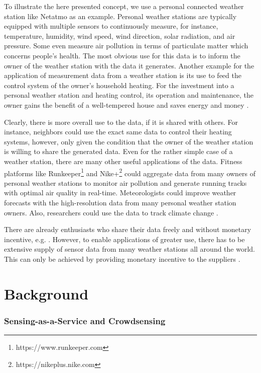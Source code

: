 To illustrate the here presented concept, we use a personal connected weather station like Netatmo \parencite{netatmo} as an example. Personal weather stations are typically equipped with multiple sensors to continuously measure, for instance, temperature, humidity, wind speed, wind direction, solar radiation, and air pressure. Some even measure air pollution in terms of particulate matter which concerns people's health. The most obvious use for this data is to inform the owner of the weather station with the data it generates. Another example for the application of measurement data from a weather station is its use to feed the control system of the owner's household heating. For the investment into a personal weather station and heating control, its operation and maintenance, the owner gains the benefit of a well-tempered house and saves energy and money \parencite{dong2014real}. 

Clearly, there is more overall use to the data, if it is shared with others. For instance, neighbors could use the exact same data to control their heating systems, however, only given the condition that the owner of the weather station is willing to share the generated data. Even for the rather simple case of a weather station, there are many other useful applications of the data. Fitness platforms like Runkeeper\footnote{https://www.runkeeper.com} and Nike+\footnote{https://nikeplus.nike.com} could aggregate data from many owners of personal weather stations to monitor air pollution and generate running tracks with optimal air quality in real-time. Meteorologists could improve weather forecasts with the high-resolution data from many personal weather station owners. Also, researchers could use the data to track climate change \parencite{JOC:JOC1276}.

There are already enthusiasts who share their data freely and without monetary incentive, e.g. \parencite{wunderground.com}. However, to enable applications of greater use, there has to be extensive supply of sensor data from many weather stations all around the world. This can only be achieved by providing monetary incentive to the suppliers \parencite{bohli2009initial}.

\section{Background}
\label{sec:s2aas_background}
\subsubsection*{Sensing-as-a-Service and Crowdsensing}

